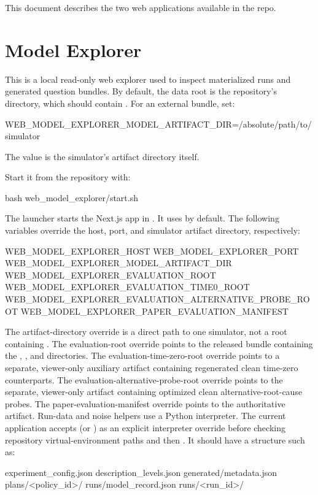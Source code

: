 \documentclass[11pt]{article}
\begin{document}
\label{docstart:web_model_explorer}
This document describes the two web applications available in the repo.
\section*{Model Explorer}

This is a local read-only web explorer used to inspect materialized \name{} runs and generated question bundles.
By default, the data root is the repository's  directory, which should contain .
For an external bundle, set:
\begin{DocCode}
WEB_MODEL_EXPLORER_MODEL_ARTIFACT_DIR=/absolute/path/to/simulator
\end{DocCode}
The value is the simulator's artifact directory itself.

Start it from the repository with:

\begin{DocCode}
bash web_model_explorer/start.sh
\end{DocCode}

The launcher starts the Next.js app in .
It uses  by default.
The following variables override the host, port, and simulator artifact directory, respectively:
\begin{DocCode}
WEB_MODEL_EXPLORER_HOST
WEB_MODEL_EXPLORER_PORT
WEB_MODEL_EXPLORER_MODEL_ARTIFACT_DIR
WEB_MODEL_EXPLORER_EVALUATION_ROOT
WEB_MODEL_EXPLORER_EVALUATION_TIME0_ROOT
WEB_MODEL_EXPLORER_EVALUATION_ALTERNATIVE_PROBE_ROOT
WEB_MODEL_EXPLORER_PAPER_EVALUATION_MANIFEST
\end{DocCode}
The artifact-directory override is a direct path to one simulator, not a root containing .
The evaluation-root override points to the released bundle containing the
, , and  directories.
The evaluation-time-zero-root override points to a separate, viewer-only
auxiliary artifact containing regenerated clean time-zero counterparts.
The evaluation-alternative-probe-root override points to the separate,
viewer-only artifact containing optimized clean alternative-root-cause probes.
The paper-evaluation-manifest override points to the authoritative
 artifact.
Run-data and noise helpers use a Python interpreter.
The current application accepts  (or ) as an explicit interpreter override before checking repository virtual-environment paths and then .
It should have a structure such as:
\begin{DocCode}
    experiment_config.json
    description_levels.json
    generated/metadata.json
    plans/<policy_id>/
    runs/model_record.json
    runs/<run_id>/
\end{DocCode}
\end{document}
